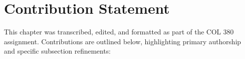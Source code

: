 
\section{Contribution Statement}
This chapter was transcribed, edited, and formatted as part of the
COL 380 assignment. Contributions are outlined below, highlighting
primary authorship and specific subsection refinements:

